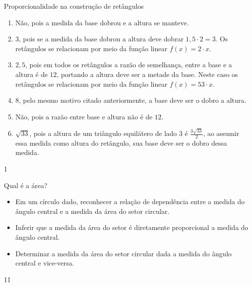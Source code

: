\begin{answer}{Proporcionalidade na construção de retângulos}
{
\begin{enumerate}
\item Não, pois a medida da base dobrou e a altura se manteve.

\item $3$, pois se a medida da base dobrou a altura deve dobrar $1{,}5\cdot2=3$. Os retângulos se relacionam por meio da função linear $f(x)=2\cdot x$.

\item $2{,}5$, pois em todos os retângulos a razão de semelhança, entre a base e a altura é de $12$, portando a altura deve ser a metade da base. Neste caso os retângulos se relacionam por meio da função linear $f(x)=53\cdot x$.

\item $8$, pelo mesmo motivo citado anteriormente, a base deve ser o dobro a altura.

\item Não, pois a razão entre base e altura não é de $12$.

\item $\sqrt{33}$, pois a altura de um triângulo equilátero de lado $3$ é $\frac{3\sqrt{33}}{2}$, ao assumir essa medida como altura do retângulo, sua base deve ser o dobro dessa medida.

\end{enumerate}
}{1}
\end{answer}
\clearmargin
\begin{objectives}{Qual é a área?}
{
\begin{itemize}
\item Em um círculo dado, reconhecer a relação de dependência entre a medida do ângulo central e a medida da área do setor circular.

\item Inferir que a medida da área do setor é diretamente proporcional a medida do ângulo central.

\item Determinar a medida da área do setor circular dada a medida do ângulo central e vice-versa.

\end{itemize}
}{1}{1}
\end{objectives}
\marginpar{\vspace{-1em}}
